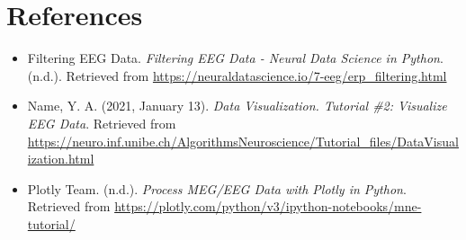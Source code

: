 \documentclass{article}
\begin{document}
\section{References}
\begin{itemize}
    \item Filtering EEG Data. \emph{Filtering EEG Data - Neural Data Science in Python}. (n.d.). Retrieved from \url{https://neuraldatascience.io/7-eeg/erp_filtering.html}
    \item Name, Y. A. (2021, January 13). \emph{Data Visualization. Tutorial \#2: Visualize EEG Data}. Retrieved from \url{https://neuro.inf.unibe.ch/AlgorithmsNeuroscience/Tutorial_files/DataVisualization.html}
    \item Plotly Team. (n.d.). \emph{Process MEG/EEG Data with Plotly in Python}. Retrieved from \url{https://plotly.com/python/v3/ipython-notebooks/mne-tutorial/}
\end{itemize}
\end{document}
